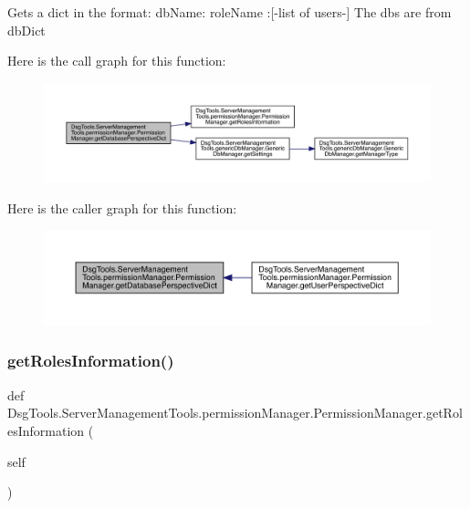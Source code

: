 \begin{DoxyVerb}Gets a dict in the format: {dbName: {roleName :[-list of users-]}}
The dbs are from dbDict 
\end{DoxyVerb}
 Here is the call graph for this function\+:
\nopagebreak
\begin{figure}[H]
\begin{center}
\leavevmode
\includegraphics[width=350pt]{class_dsg_tools_1_1_server_management_tools_1_1permission_manager_1_1_permission_manager_a11c1a21b45f76b92225d78962b8b8e55_cgraph}
\end{center}
\end{figure}
Here is the caller graph for this function\+:
\nopagebreak
\begin{figure}[H]
\begin{center}
\leavevmode
\includegraphics[width=350pt]{class_dsg_tools_1_1_server_management_tools_1_1permission_manager_1_1_permission_manager_a11c1a21b45f76b92225d78962b8b8e55_icgraph}
\end{center}
\end{figure}
\mbox{\label{class_dsg_tools_1_1_server_management_tools_1_1permission_manager_1_1_permission_manager_a164d75a558e236cd4c76cb0c451d513a}} 
\subsubsection{\texorpdfstring{get\+Roles\+Information()}{getRolesInformation()}}
{\footnotesize\ttfamily def Dsg\+Tools.\+Server\+Management\+Tools.\+permission\+Manager.\+Permission\+Manager.\+get\+Roles\+Information (\begin{DoxyParamCaption}\item[{}]{self }\end{DoxyParamCaption})}

